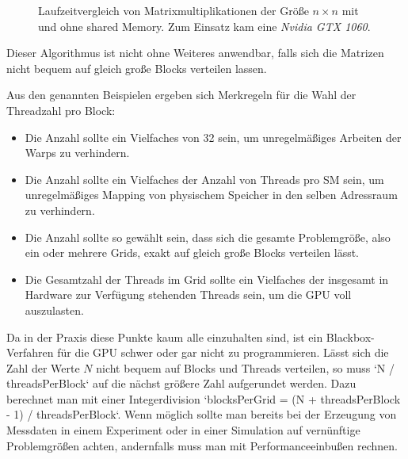         \begin{figure}[h]
  		\centering
  		\caption[Matrixmultiplikation shared Memory]{Laufzeitvergleich von Matrixmultiplikationen der Größe $n\times n$ mit und ohne shared Memory. Zum Einsatz kam eine \textit{Nvidia GTX 1060}.}
  		\label{fig3:matmul}
		\end{figure}
        
        Dieser Algorithmus ist nicht ohne Weiteres anwendbar, falls sich die Matrizen nicht bequem auf gleich große \Glspl{Block} verteilen lassen.
        
        Aus den genannten Beispielen ergeben sich Merkregeln für die Wahl der \Gls{Thread}zahl pro \Gls{Block}:
        \begin{itemize}
        	\item Die Anzahl sollte ein Vielfaches von 32 sein, um unregelmäßiges Arbeiten der \Glspl{Warp} zu verhindern.
        	\item Die Anzahl sollte ein Vielfaches der Anzahl von \Glspl{Thread} pro \Gls{SM} sein, um unregelmäßiges Mapping von physischem Speicher in den selben Adressraum zu verhindern.
        	\item Die Anzahl sollte so gewählt sein, dass sich die gesamte Problemgröße, also ein oder mehrere \Glspl{Grid}, exakt auf gleich große \Glspl{Block} verteilen lässt.
        	\item Die Gesamtzahl der \Glspl{Thread} im \Gls{Grid} sollte ein Vielfaches der insgesamt in Hardware zur Verfügung stehenden \Glspl{Thread} sein, um die GPU voll auszulasten.
        \end{itemize}
        
        Da in der Praxis diese Punkte kaum alle einzuhalten sind, ist ein Blackbox-Verfahren für die GPU schwer oder gar nicht zu programmieren. Lässt sich die Zahl der Werte $N$ nicht bequem auf \Glspl{Block} und \Glspl{Thread} verteilen, so muss \li`N / threadsPerBlock` auf die nächst größere Zahl aufgerundet werden. Dazu berechnet man mit einer Integerdivision \li`blocksPerGrid = (N + threadsPerBlock - 1) / threadsPerBlock`. Wenn möglich sollte man bereits bei der Erzeugung von Messdaten in einem Experiment oder in einer Simulation auf vernünftige Problemgrößen achten, andernfalls muss man mit \Gls{Performance}einbußen rechnen.
        				
